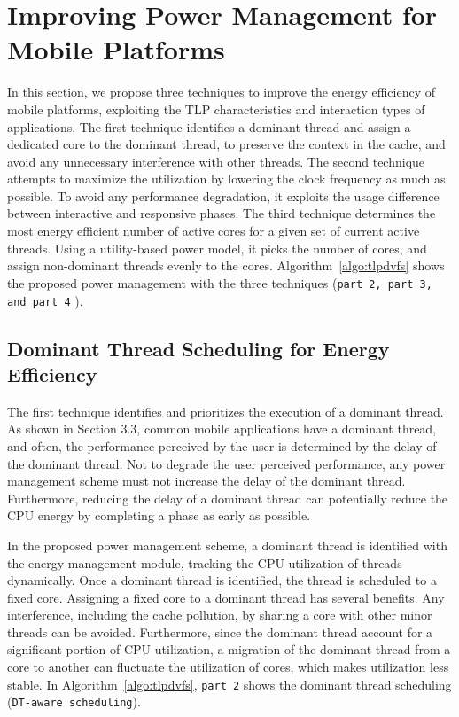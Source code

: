 \section{Improving Power Management for Mobile Platforms}

In this section, we propose three techniques to improve the energy efficiency of
mobile platforms, exploiting the TLP characteristics and interaction types of
applications. The first technique identifies a dominant thread and
assign a dedicated core to the dominant thread, to preserve the context
in the cache, and avoid any unnecessary interference with other threads.
The second technique attempts to maximize the utilization by lowering
the clock frequency as much as possible. To avoid any performance degradation,
it exploits the usage difference between interactive and responsive phases.
The third technique determines the most energy efficient number of
active cores for a given set of current active threads. Using a utility-based
power model, it picks the number of cores, and assign non-dominant threads
evenly to the cores.
Algorithm~\ref{algo:tlpdvfs} shows the proposed power management with the 
three techniques ({\tt part 2, part 3, and part 4} ).

\subsection{Dominant Thread Scheduling for Energy Efficiency}

The first technique identifies and prioritizes the execution of
a dominant thread. As shown in Section 3.3, 
common mobile applications have a dominant thread, and often,
the performance perceived by the user is determined by the delay of 
the dominant thread. Not to degrade the user perceived performance,
any power management scheme must not increase the delay of
the dominant thread. Furthermore, reducing the delay of a dominant thread
can potentially reduce the CPU energy by completing a phase as early
as possible.

In the proposed power management scheme, a dominant thread is identified
with the energy management module, tracking the CPU utilization of 
threads dynamically. Once a dominant thread is identified, the thread
is scheduled to a fixed core. Assigning a fixed core to a dominant thread
has several benefits. Any interference, including the cache pollution, 
by sharing a core with other minor threads can be avoided. Furthermore, since the
dominant thread account for a significant portion of CPU utilization,
a migration of the dominant thread from a core to another can fluctuate
the utilization of cores, which makes utilization less stable.
In Algorithm~\ref{algo:tlpdvfs}, {\tt part 2} shows the dominant thread scheduling
({\tt DT-aware scheduling}).

